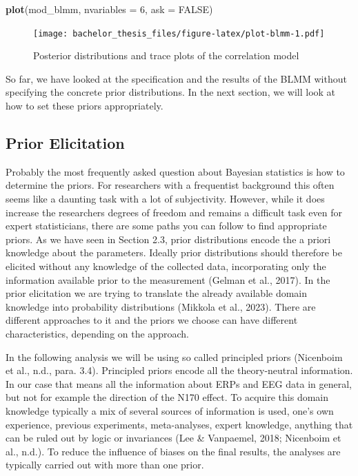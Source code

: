 \documentclass[
  doc,12pt,floatsintext]{apa7}
\newenvironment{Shaded}{\begin{snugshade}}{\end{snugshade}}
\newcommand{\AttributeTok}[1]{\textcolor[rgb]{0.13,0.29,0.53}{#1}}
\newcommand{\ConstantTok}[1]{\textcolor[rgb]{0.56,0.35,0.01}{#1}}
\newcommand{\DecValTok}[1]{\textcolor[rgb]{0.00,0.00,0.81}{#1}}
\newcommand{\FunctionTok}[1]{\textcolor[rgb]{0.13,0.29,0.53}{\textbf{#1}}}
\newcommand{\NormalTok}[1]{#1}
\begin{document}
\begin{Shaded}
\begin{Highlighting}[]
\FunctionTok{plot}\NormalTok{(mod\_blmm, }\AttributeTok{nvariables =} \DecValTok{6}\NormalTok{, }\AttributeTok{ask =} \ConstantTok{FALSE}\NormalTok{)}
\end{Highlighting}
\end{Shaded}

\begin{figure}
\centering
\texttt{[image: bachelor\_thesis\_files/figure-latex/plot-blmm-1.pdf]}
\caption{\label{fig:plot-blmm}Posterior distributions and trace plots of the correlation model}
\end{figure}

So far, we have looked at the specification and the results of the BLMM without specifying the concrete prior distributions. In the next section, we will look at how to set these priors appropriately.

\subsection{Prior Elicitation}\label{prior-elicitation}

Probably the most frequently asked question about Bayesian statistics is how to determine the priors. For researchers with a frequentist background this often seems like a daunting task with a lot of subjectivity. However, while it does increase the researchers degrees of freedom and remains a difficult task even for expert statisticians, there are some paths you can follow to find appropriate priors. As we have seen in Section 2.3, prior distributions encode the a priori knowledge about the parameters. Ideally prior distributions should therefore be elicited without any knowledge of the collected data, incorporating only the information available prior to the measurement (Gelman et al., 2017). In the prior elicitation we are trying to translate the already available domain knowledge into probability distributions (Mikkola et al., 2023). There are different approaches to it and the priors we choose can have different characteristics, depending on the approach.

In the following analysis we will be using so called principled priors (Nicenboim et al., n.d., para. 3.4). Principled priors encode all the theory-neutral information. In our case that means all the information about ERPs and EEG data in general, but not for example the direction of the N170 effect. To acquire this domain knowledge typically a mix of several sources of information is used, one's own experience, previous experiments, meta-analyses, expert knowledge, anything that can be ruled out by logic or invariances (Lee \& Vanpaemel, 2018; Nicenboim et al., n.d.). To reduce the influence of biases on the final results, the analyses are typically carried out with more than one prior.
\end{document}
